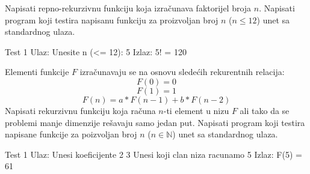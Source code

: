 \begin{Exercise}[label=105]
  Napisati repno-rekurzivnu funkciju koja izračunava faktorijel broja $n$. Napisati program koji testira napisanu funkciju za proizvoljan broj $n$ ($n \le 12$) unet sa standardnog ulaza.
  
\begin{miditest}
\begin{test}{Test 1}
Ulaz:   Unesite n (<= 12): 5
Izlaz:  5! = 120
\end{test}
\end{miditest}

\end{Exercise}
\begin{Answer}[ref=105]
\end{Answer}


\begin{Exercise}[label=106]
Elementi funkcije $F$ izračunavaju se na osnovu sledećih rekurentnih relacija:
 $$F(0) = 0$$
 $$F(1) = 1$$
 $$F(n) = a* F(n-1) + b*F(n-2)$$
Napisati rekurzivnu funkciju  koja računa $n$-ti element u nizu $F$ ali tako da se problemi manje dimenzije rešavaju samo jedan put.
Napisati program koji testira napisane funkcije za poizvoljan broj $n$ ($n \in \mathbb N$) unet sa standardnog ulaza.
  
\begin{miditest}
\begin{test}{Test 1}
Ulaz:   Unesi koeficijente
        2 3
        Unesi koji clan niza racunamo
        5
Izlaz:  F(5) = 61
\end{test}
\end{miditest}

\end{Exercise}
\begin{Answer}[ref=106]
\end{Answer}

